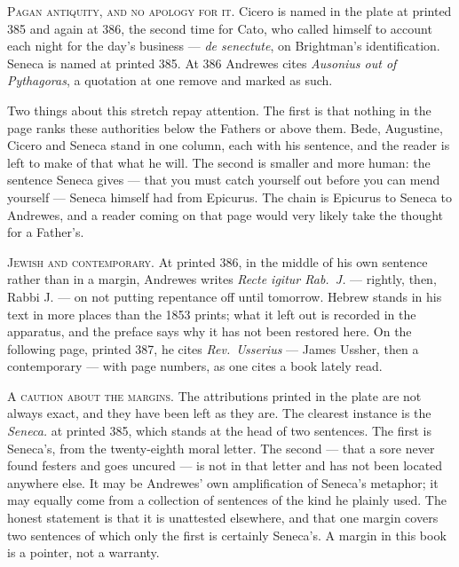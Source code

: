 \vspace{0.8\baselineskip}
{\scshape Pagan antiquity, and no apology for it.}\quad
Cicero is named in the plate at printed 385 and again at 386, the second time for
Cato, who called himself to account each night for the day's business ---
\emph{de senectute}, on Brightman's identification. Seneca is named at printed
385. At 386 Andrewes cites \emph{Ausonius out of Pythagoras}, a quotation at one
remove and marked as such.

Two things about this stretch repay attention. The first is that nothing in the
page ranks these authorities below the Fathers or above them. Bede, Augustine,
Cicero and Seneca stand in one column, each with his sentence, and the reader is
left to make of that what he will. The second is smaller and more human: the
sentence Seneca gives --- that you must catch yourself out before you can mend
yourself --- Seneca himself had from Epicurus. The chain is Epicurus to Seneca to
Andrewes, and a reader coming on that page would very likely take the thought for
a Father's.

\vspace{0.8\baselineskip}
{\scshape Jewish and contemporary.}\quad
At printed 386, in the middle of his own sentence rather than in a margin,
Andrewes writes \emph{Recte igitur Rab.\ J.} --- rightly, then, Rabbi J. --- on
not putting repentance off until tomorrow. Hebrew stands in his text in more
places than the 1853 prints; what it left out is recorded in the apparatus, and
the preface says why it has not been restored here. On the following page,
printed 387, he cites \emph{Rev.\ Usserius} --- James Ussher, then a
contemporary --- with page numbers, as one cites a book lately read.

\vspace{0.8\baselineskip}
{\scshape A caution about the margins.}\quad
The attributions printed in the plate are not always exact, and they have been
left as they are. The clearest instance is the \emph{Seneca.} at printed 385,
which stands at the head of two sentences. The first is Seneca's, from the
twenty-eighth moral letter. The second --- that a sore never found festers and
goes uncured --- is not in that letter and has not been located anywhere else.
It may be Andrewes' own amplification of Seneca's metaphor; it may equally come
from a collection of sentences of the kind he plainly used. The honest statement
is that it is unattested elsewhere, and that one margin covers two sentences of
which only the first is certainly Seneca's. A margin in this book is a pointer,
not a warranty.

\endgroup
\clearpage
